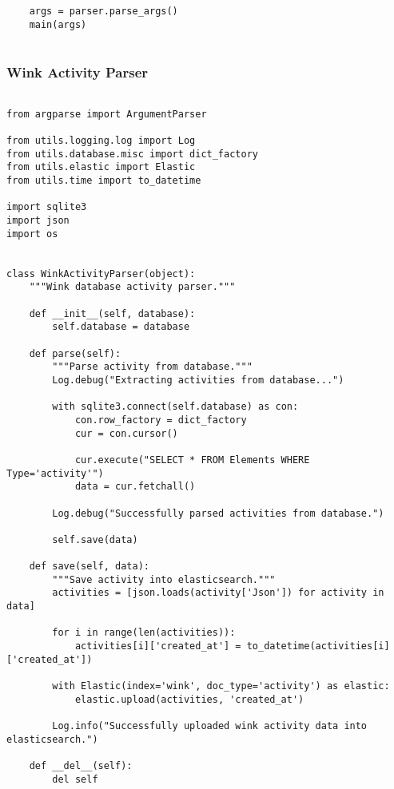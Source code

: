 \documentclass{easychair}
\begin{document}
\begin{enumerate}
\begin{lstlisting}
    args = parser.parse_args()
    main(args)


\end{lstlisting}

\subsubsection{Wink Activity Parser}

\lstset{language=Python}
\lstset{frame=lines}
\lstset{basicstyle=\footnotesize}
\begin{lstlisting}

from argparse import ArgumentParser

from utils.logging.log import Log
from utils.database.misc import dict_factory
from utils.elastic import Elastic
from utils.time import to_datetime

import sqlite3
import json
import os


class WinkActivityParser(object):
    """Wink database activity parser."""

    def __init__(self, database):
        self.database = database

    def parse(self):
        """Parse activity from database."""
        Log.debug("Extracting activities from database...")

        with sqlite3.connect(self.database) as con:
            con.row_factory = dict_factory
            cur = con.cursor()

            cur.execute("SELECT * FROM Elements WHERE Type='activity'")
            data = cur.fetchall()

        Log.debug("Successfully parsed activities from database.")

        self.save(data)

    def save(self, data):
        """Save activity into elasticsearch."""
        activities = [json.loads(activity['Json']) for activity in data]

        for i in range(len(activities)):
            activities[i]['created_at'] = to_datetime(activities[i]['created_at'])

        with Elastic(index='wink', doc_type='activity') as elastic:
            elastic.upload(activities, 'created_at')

        Log.info("Successfully uploaded wink activity data into elasticsearch.")

    def __del__(self):
        del self



\end{lstlisting}
\end{enumerate}
\end{document}
